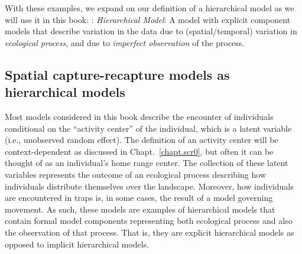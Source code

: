 With these examples,
we expand on our definition of a hierarchical model as we will use it
in this book: \newline
{: {\it Hierarchical Model}: A model with
  explicit component models that describe variation in the data due to
  (spatial/temporal) variation in {\it ecological process}, and due to
  {\it imperfect observation} of the process.
}














\subsection{Spatial capture-recapture models as hierarchical models}

Most models considered in this book describe the encounter of
individuals conditional on the ``activity center'' of the individual,
which is a latent variable (i.e., unobserved random effect).
The definition of an activity center will be context-dependent as
discussed in Chapt.~\ref{chapt.scr0}, but
often it can be thought of as an individual's home range center.
The collection of these latent variables represents the outcome of an
ecological process describing how individuals distribute themselves
over the landscape. Moreover, how individuals are encountered in traps
is, in some cases, the result of a model governing movement.  As such,
these models are examples of hierarchical models that contain formal
model components representing both ecological process and also the
observation of that process. That is, they are explicit hierarchical
models \citep{royle_dorazio:2008} as opposed to implicit hierarchical
models.




